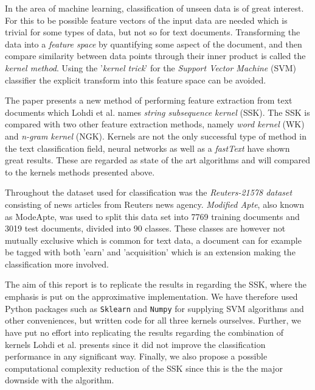 
In the area of machine learning, classification of unseen data is of great interest. For this to be possible feature vectors of the input data are needed which is trivial for some types of data, but not so for text documents. Transforming the data into a \textit{feature space} by quantifying some aspect of the document, and then compare similarity between data points through their inner product is called the \textit{kernel method}. Using the '\textit{kernel trick}' for the \textit{Support Vector Machine} (SVM) classifier the explicit transform into this feature space can be avoided.%

The paper \cite{lodhi} presents a new method of performing feature extraction from text documents which Lohdi et al. names \textit{string subsequence kernel} (SSK). The SSK is compared with two other feature extraction methods, namely \textit{word kernel} (WK) and \textit{n-gram kernel} (NGK). Kernels are not the only successful type of method in the text classification field, neural networks as well as a \textit{fastText} \cite{joulin2016bag} have shown great results. These are regarded as state of the art algorithms and will compared to the kernels methods presented above. 

Throughout \cite{lodhi} the dataset used for classification was the \textit{Reuters-21578 dataset} consisting of news articles from Reuters news agency. \textit{Modified Apte}, also known as ModeApte, was used to split this data set into 7769 training documents and 3019 test documents, divided into 90 classes. These classes are however not mutually exclusive which is common for text data, a document can for example be tagged with both 'earn' and 'acquisition' which is an extension making the classification more involved.

The aim of this report is to replicate the results in \cite{lodhi} regarding the SSK, where the emphasis is put on the approximative implementation. We have therefore used Python packages such as \texttt{Sklearn} and \texttt{Numpy} for supplying SVM algorithms and other conveniences, but written code for all three kernels ourselves. Further, we have put no effort into replicating the results regarding the combination of kernels Lohdi et al. presents since it did not improve the classification performance in any significant way. Finally, we also propose a possible computational complexity reduction of the SSK since this is the the major downside with the algorithm.

